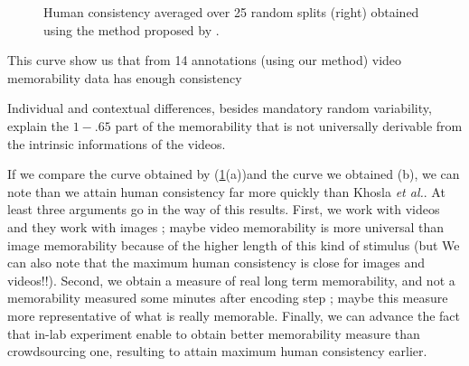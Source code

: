 \documentclass[sigconf]{acmart}
\begin{document}
\begin{figure}[!htbp]
	\centering
	\quad
	\caption{\label{fig:human_consistency}Human consistency averaged over 25 random splits (right) obtained using the method proposed by \cite{isola_2014_makes}.}
\end{figure}

This curve show us that from 14 annotations (using our method) video memorability data has enough consistency

Individual and contextual differences, besides mandatory random variability, explain the $1-.65$ part of the memorability that is not universally derivable from the intrinsic informations of the videos.  

If we compare the curve obtained by \cite{khosla_2015_understanding} (\ref{fig:human_consistency}(a))and the curve we obtained (b), we can note than we attain human consistency far more quickly than Khosla \textit{et al.}. At least three arguments go in the way of this results. First, we work with videos and they work with images ; maybe video memorability is more universal than image memorability because of the higher length of this kind of stimulus (but We can also note that the maximum human consistency is close for images and videos!!). Second, we obtain a measure of real long term memorability, and not a memorability measured some minutes after encoding step ; maybe this measure more representative of what is really memorable. Finally, we can advance the fact that in-lab experiment enable to obtain better memorability measure than crowdsourcing one, resulting to attain maximum human consistency earlier.
\end{document}
